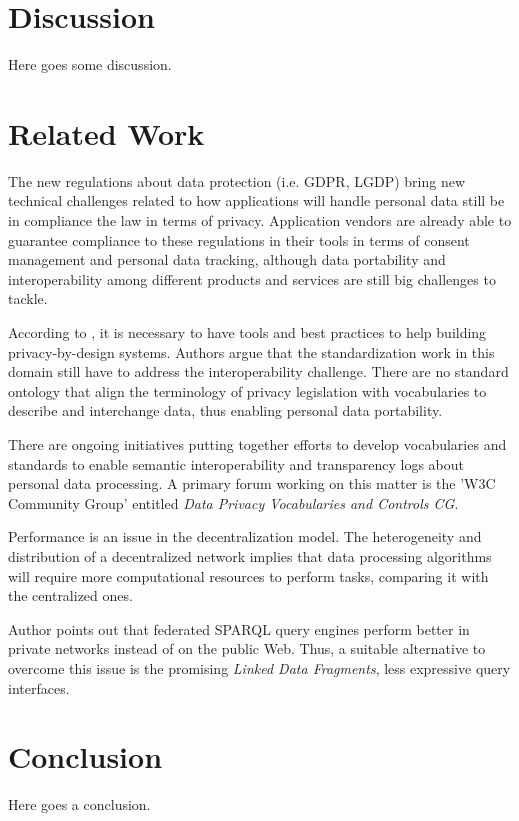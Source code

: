 \documentclass[sigconf]{acmart}
\begin{document}
\section{Discussion}

Here goes some discussion.

\section{Related Work}
The new regulations about data protection (i.e. GDPR, LGDP) bring new technical challenges related to how applications will handle personal data still be in compliance the law in terms of privacy. Application vendors are already able to guarantee compliance to these regulations in their tools in terms of consent management and personal data tracking, although data portability and interoperability among different products and services are still big challenges to tackle.

According to \cite{bonatti2018data}, it is necessary to have tools and best practices to help building privacy-by-design systems\cite{cavoukian2009privacy}. Authors argue that the standardization work in this domain still have to address the interoperability challenge. There are no standard ontology that align the terminology of privacy legislation with vocabularies to describe and interchange data, thus enabling personal data portability.

There are ongoing initiatives putting together efforts to develop vocabularies and standards to enable semantic interoperability and transparency logs about personal data processing. A primary forum working on this matter is the 'W3C Community Group' entitled \textit{Data Privacy Vocabularies and Controls CG}.

Performance is an issue in the decentralization model\cite{verborgh_iswc_2018}. The heterogeneity and distribution of a decentralized network implies that data processing algorithms will require more computational resources to perform tasks, comparing it with the centralized ones.

Author points out that federated SPARQL query engines perform better in private networks instead of on the public Web. Thus, a suitable alternative to overcome this issue is the promising \linebreak \textit{Linked Data Fragments}\cite{LDF}, less expressive query interfaces. 

\section{Conclusion}
Here goes a conclusion.
\end{document}

